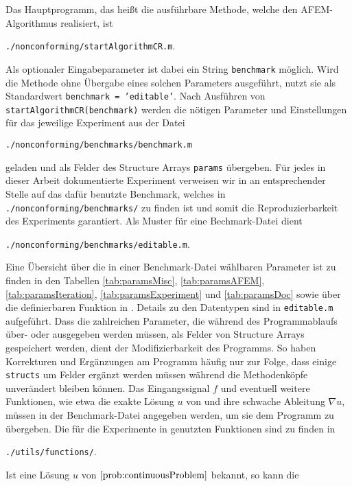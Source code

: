 Das Hauptprogramm, das heißt die ausführbare Methode, welche den
AFEM\--Al\-go\-rith\-mus realisiert, ist
\begin{center}
  \texttt{./nonconforming/startAlgorithmCR.m}.
\end{center}
Als optionaler Eingabeparameter ist dabei ein String \texttt{benchmark}
möglich. 
Wird die Methode ohne Übergabe eines solchen Parameters ausgeführt, nutzt
sie als Standardwert \texttt{benchmark = 'editable'}.
Nach Ausführen von \texttt{startAlgorithmCR(benchmark)} werden die nötigen
Parameter und Einstellungen für das jeweilige Experiment aus der Datei
\begin{center}
  \texttt{./nonconforming/benchmarks/benchmark.m}
\end{center}
geladen und als Felder des Structure Arrays \texttt{params} übergeben. Für
jedes in dieser Arbeit dokumentierte Experiment verweisen wir in
 an entsprechender Stelle auf das dafür benutzte 
Benchmark, welches in \texttt{./nonconforming/benchmarks/} zu finden ist und
somit die Reproduzierbarkeit des Experiments garantiert. 
Als Muster für eine Bechmark-Datei dient
\begin{center}
  \texttt{./nonconforming/benchmarks/editable.m}.
\end{center}
Eine Übersicht über die in einer Benchmark-Datei wählbaren Parameter ist
zu finden in den Tabellen \ref{tab:paramsMisc}, \ref{tab:paramsAFEM}, 
\ref{tab:paramsIteration}, \ref{tab:paramsExperiment} und \ref{tab:paramsDoc}
sowie über die definierbaren Funktion in .
Details zu den Datentypen sind in \texttt{editable.m} aufgeführt.
Dass die zahlreichen Parameter, die während des Pro\-gramm\-ab\-laufs
über- oder ausgegeben werden müssen, als Felder von
Struc\-ture Ar\-rays gespeichert werden, dient der Modifizierbarkeit des
Programms. 
So haben Korrekturen und Ergänzungen am Programm häufig nur zur Folge, dass
einige \texttt{structs} um Felder ergänzt werden müssen während die 
Methodenköpfe unverändert bleiben können.
Das Eingangssignal $f$ und eventuell weitere Funktionen, wie etwa die exakte
Lösung $u$ von  und ihre schwache Ableitung
$\nabla u$, müssen in der Benchmark-Datei angegeben werden, um sie dem
Programm zu übergeben. 
Die für die Experimente in  genutzten Funktionen sind zu
finden in 
\begin{center}
  \texttt{./utils/functions/}.
\end{center}
Ist eine Lösung $u$ von $\Cref{prob:continuousProblem}$ bekannt, so kann die
